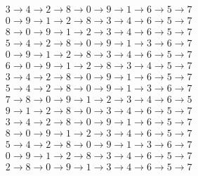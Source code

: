 \documentclass[12pt]{scrartcl}
\begin{document}
\begin{align*}
    & 3\rightarrow 4\rightarrow 2\rightarrow 8\rightarrow 0\rightarrow 9\rightarrow 1\rightarrow 6\rightarrow 5\rightarrow 7 \\
    & 0\rightarrow 9\rightarrow 1\rightarrow 2\rightarrow 8\rightarrow 3\rightarrow 4\rightarrow 6\rightarrow 5\rightarrow 7 \\
    & 8\rightarrow 0\rightarrow 9\rightarrow 1\rightarrow 2\rightarrow 3\rightarrow 4\rightarrow 6\rightarrow 5\rightarrow 7 \\
    & 5\rightarrow 4\rightarrow 2\rightarrow 8\rightarrow 0\rightarrow 9\rightarrow 1\rightarrow 3\rightarrow 6\rightarrow 7 \\
    & 0\rightarrow 9\rightarrow 1\rightarrow 2\rightarrow 8\rightarrow 3\rightarrow 4\rightarrow 6\rightarrow 5\rightarrow 7 \\
    & 6\rightarrow 0\rightarrow 9\rightarrow 1\rightarrow 2\rightarrow 8\rightarrow 3\rightarrow 4\rightarrow 5\rightarrow 7 \\
    & 3\rightarrow 4\rightarrow 2\rightarrow 8\rightarrow 0\rightarrow 9\rightarrow 1\rightarrow 6\rightarrow 5\rightarrow 7 \\
    & 5\rightarrow 4\rightarrow 2\rightarrow 8\rightarrow 0\rightarrow 9\rightarrow 1\rightarrow 3\rightarrow 6\rightarrow 7 \\
    & 7\rightarrow 8\rightarrow 0\rightarrow 9\rightarrow 1\rightarrow 2\rightarrow 3\rightarrow 4\rightarrow 6\rightarrow 5 \\
    & 9\rightarrow 1\rightarrow 2\rightarrow 8\rightarrow 0\rightarrow 3\rightarrow 4\rightarrow 6\rightarrow 5\rightarrow 7 \\
    & 3\rightarrow 4\rightarrow 2\rightarrow 8\rightarrow 0\rightarrow 9\rightarrow 1\rightarrow 6\rightarrow 5\rightarrow 7 \\
    & 8\rightarrow 0\rightarrow 9\rightarrow 1\rightarrow 2\rightarrow 3\rightarrow 4\rightarrow 6\rightarrow 5\rightarrow 7 \\
    & 5\rightarrow 4\rightarrow 2\rightarrow 8\rightarrow 0\rightarrow 9\rightarrow 1\rightarrow 3\rightarrow 6\rightarrow 7 \\
    & 0\rightarrow 9\rightarrow 1\rightarrow 2\rightarrow 8\rightarrow 3\rightarrow 4\rightarrow 6\rightarrow 5\rightarrow 7 \\
    & 2\rightarrow 8\rightarrow 0\rightarrow 9\rightarrow 1\rightarrow 3\rightarrow 4\rightarrow 6\rightarrow 5\rightarrow 7
\end{align*}
\end{document}
